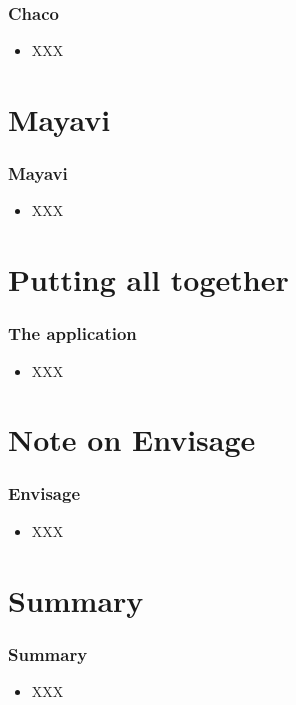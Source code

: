 \documentclass[14pt,compress]{beamer}
\begin{document}
\begin{frame}
  \frametitle{Chaco}
  \begin{itemize}
      \item XXX
 \end{itemize}
\end{frame}

\section{Mayavi}

\begin{frame}
  \frametitle{Mayavi}
  \begin{itemize}
      \item XXX
 \end{itemize}
\end{frame}

\section{Putting all together}

\begin{frame}
  \frametitle{The application}
  \begin{itemize}
      \item XXX
 \end{itemize}
\end{frame}

\section{Note on Envisage}

\begin{frame}
  \frametitle{Envisage}
  \begin{itemize}
      \item XXX
 \end{itemize}
\end{frame}

\section{Summary}

\begin{frame}
  \frametitle{Summary}
  \begin{itemize}
      \item XXX
 \end{itemize}
\end{frame}
\end{document}
